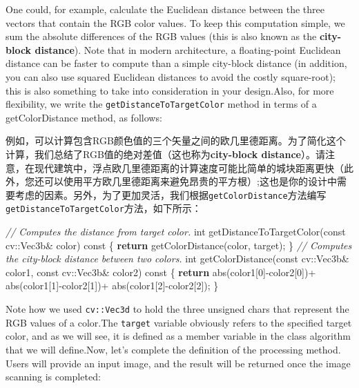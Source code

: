 \documentclass[]{article}
\newenvironment{Shaded}{}{}
\newcommand{\AttributeTok}[1]{\textcolor[rgb]{0.49,0.56,0.16}{#1}}
\newcommand{\CommentTok}[1]{\textcolor[rgb]{0.38,0.63,0.69}{\textit{#1}}}
\newcommand{\ControlFlowTok}[1]{\textcolor[rgb]{0.00,0.44,0.13}{\textbf{#1}}}
\newcommand{\DataTypeTok}[1]{\textcolor[rgb]{0.56,0.13,0.00}{#1}}
\newcommand{\DecValTok}[1]{\textcolor[rgb]{0.25,0.63,0.44}{#1}}
\newcommand{\NormalTok}[1]{#1}
\begin{document}
One could, for example, calculate the Euclidean distance between the
three vectors that contain the RGB color values. To keep this
computation simple, we sum the absolute differences of the RGB values
(this is also known as the \textbf{city-block distance}). Note that in
modern architecture, a floating-point Euclidean distance can be faster
to compute than a simple city-block distance (in addition, you can also
use squared Euclidean distances to avoid the costly square-root); this
is also something to take into consideration in your design.Also, for
more flexibility, we write the \texttt{getDistanceToTargetColor} method
in terms of a getColorDistance method, as follows:

例如，可以计算包含RGB颜色值的三个矢量之间的欧几里德距离。为了简化这个计算，我们总结了RGB值的绝对差值（这也称为\textbf{city-block
distance}）。请注意，在现代建筑中，浮点欧几里德距离的计算速度可能比简单的城块距离更快（此外，您还可以使用平方欧几里德距离来避免昂贵的平方根）;这也是你的设计中需要考虑的因素。另外，为了更加灵活，我们根据\texttt{getColorDistance}方法编写\texttt{getDistanceToTargetColor}方法，如下所示：

\begin{Shaded}
\begin{Highlighting}[]
\CommentTok{// Computes the distance from target color.}
\DataTypeTok{int}\NormalTok{ getDistanceToTargetColor(}\AttributeTok{const}\NormalTok{ cv::Vec3b& color) }\AttributeTok{const}\NormalTok{ \{}
	\ControlFlowTok{return}\NormalTok{ getColorDistance(color, target);}
\NormalTok{\}}
\CommentTok{// Computes the city-block distance between two colors.}
\DataTypeTok{int}\NormalTok{ getColorDistance(}\AttributeTok{const}\NormalTok{ cv::Vec3b& color1,}
\AttributeTok{const}\NormalTok{ cv::Vec3b& color2) }\AttributeTok{const}\NormalTok{ \{}
    \ControlFlowTok{return}\NormalTok{ abs(color1[}\DecValTok{0}\NormalTok{]-color2[}\DecValTok{0}\NormalTok{])+}
\NormalTok{           abs(color1[}\DecValTok{1}\NormalTok{]-color2[}\DecValTok{1}\NormalTok{])+}
\NormalTok{           abs(color1[}\DecValTok{2}\NormalTok{]-color2[}\DecValTok{2}\NormalTok{]);}
\NormalTok{\}}
\end{Highlighting}
\end{Shaded}

Note how we used \texttt{cv::Vec3d} to hold the three unsigned chars
that represent the RGB values of a color.The \texttt{target} variable
obviously refers to the specified target color, and as we will see, it
is defined as a member variable in the class algorithm that we will
define.Now, let's complete the definition of the processing method.
Users will provide an input image, and the result will be returned once
the image scanning is completed:
\end{document}
